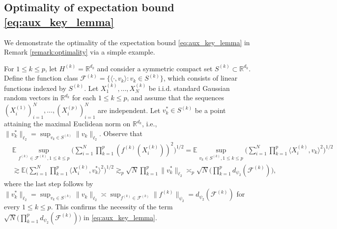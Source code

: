 \documentclass[numbers,webpdf,imaiai]{ima-authoring-template}
\theoremstyle{thmstyletwo}%
\numberwithin{equation}{section}
\numberwithin{equation}{section}
\providecommand{\mathbbm}{\mathbb} %
\newcommand{\R}{\mathbbm{R}}
\newcommand{\F}{\mathcal{F}}
\newcommand{\E}{\mathbb{E}}
\begin{document}
\begin{appendix}
\section{Optimality of expectation bound \eqref{eq:aux_key_lemma}}\label{app:B}

We demonstrate the optimality of the expectation bound \eqref{eq:aux_key_lemma} in Remark \ref{remark:optimality} via a simple example. 

For $1\le k\le p$, let $H^{(k)}=\R^{d_k}$ and consider a symmetric compact set $S^{(k)}\subset \R^{d_k}$. Define the function class $\F^{(k)}=\{\langle \cdot,v_k \rangle: v_k\in S^{(k)} \}$, which consists of linear functions indexed by $S^{(k)}$. Let $X^{(k)}_1,\ldots,X^{(k)}_N$ be i.i.d. standard Gaussian random vectors in $\R^{d_k}$ for each $1\le k\le p$, and assume that the sequences $(X^{(1)}_i)_{i=1}^{N},\ldots,(X_i^{(p)})_{i=1}^{N}$ are independent. Let $v_k^{*}\in S^{(k)}$ be a point attaining the maximal Euclidean norm on $\R^{d_k}$, i.e., $ \|v_k^{*}\|_{\ell_2}=\sup_{v_k\in S^{(k)}}\|v_k\|_{\ell_2}$. Observe that
\begin{align}\label{eq:remark_aux1}
    &\E \sup_{f^{(k)}\in \F^{(k)},1\le k\le p} \bigg(\sum_{i=1}^{N}\prod_{k=1}^{p} \left(f^{(k)}(X_i^{(k)})\right)^2\bigg)^{1/2} =\E \sup_{v_k\in S^{(k)},1\le k\le p} \bigg(\sum_{i=1}^{N}\prod_{k=1}^{p}\langle X_i^{(k)},v_k \rangle^2 \bigg)^{1/2}\nonumber\\
    &\gtrsim \E \bigg(\sum_{i=1}^{N}\prod_{k=1}^{p}\langle X_i^{(k)},v^{*}_{k} \rangle^2 \bigg)^{1/2}\gtrsim_p \sqrt{N}\prod_{k=1}^{p}\|v^{*}_{k}\|_{\ell_2}\asymp_p \sqrt{N}\bigg(\prod_{k=1}^{p} d_{\psi_2}(\F^{(k)})\bigg), 
\end{align}
where the last step follows by $\|v_k^{*}\|_{\ell_2}=\sup_{v_k\in S^{(k)}}\|v_k\|_{\ell_2}\asymp \sup_{f^{(k)}\in \F^{(k)}}\|f^{(k)}\|_{\psi_2}= d_{\psi_2}(\F^{(k)})$ for every $1\le k\le p$. This confirms the necessity of the term $\sqrt{N}\big(\prod_{k=1}^{p} d_{\psi_2}(\F^{(k)})\big)$ in \eqref{eq:aux_key_lemma}.


\end{appendix}
\end{document}
